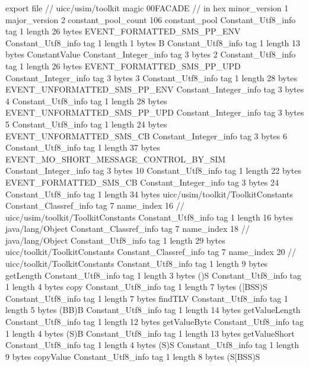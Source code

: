 export file {		// uicc/usim/toolkit
	magic	00FACADE		 // in hex
	minor_version	1
	major_version	2
	constant_pool_count	106
	constant_pool {
		Constant_Utf8_info {
			tag	1
			length	26
			bytes	EVENT_FORMATTED_SMS_PP_ENV
		}
		Constant_Utf8_info {
			tag	1
			length	1
			bytes	B
		}
		Constant_Utf8_info {
			tag	1
			length	13
			bytes	ConstantValue
		}
		Constant_Integer_info {
			tag	3
			bytes	2
		}
		Constant_Utf8_info {
			tag	1
			length	26
			bytes	EVENT_FORMATTED_SMS_PP_UPD
		}
		Constant_Integer_info {
			tag	3
			bytes	3
		}
		Constant_Utf8_info {
			tag	1
			length	28
			bytes	EVENT_UNFORMATTED_SMS_PP_ENV
		}
		Constant_Integer_info {
			tag	3
			bytes	4
		}
		Constant_Utf8_info {
			tag	1
			length	28
			bytes	EVENT_UNFORMATTED_SMS_PP_UPD
		}
		Constant_Integer_info {
			tag	3
			bytes	5
		}
		Constant_Utf8_info {
			tag	1
			length	24
			bytes	EVENT_UNFORMATTED_SMS_CB
		}
		Constant_Integer_info {
			tag	3
			bytes	6
		}
		Constant_Utf8_info {
			tag	1
			length	37
			bytes	EVENT_MO_SHORT_MESSAGE_CONTROL_BY_SIM
		}
		Constant_Integer_info {
			tag	3
			bytes	10
		}
		Constant_Utf8_info {
			tag	1
			length	22
			bytes	EVENT_FORMATTED_SMS_CB
		}
		Constant_Integer_info {
			tag	3
			bytes	24
		}
		Constant_Utf8_info {
			tag	1
			length	34
			bytes	uicc/usim/toolkit/ToolkitConstants
		}
		Constant_Classref_info {
			tag	7
			name_index	16		// uicc/usim/toolkit/ToolkitConstants
		}
		Constant_Utf8_info {
			tag	1
			length	16
			bytes	java/lang/Object
		}
		Constant_Classref_info {
			tag	7
			name_index	18		// java/lang/Object
		}
		Constant_Utf8_info {
			tag	1
			length	29
			bytes	uicc/toolkit/ToolkitConstants
		}
		Constant_Classref_info {
			tag	7
			name_index	20		// uicc/toolkit/ToolkitConstants
		}
		Constant_Utf8_info {
			tag	1
			length	9
			bytes	getLength
		}
		Constant_Utf8_info {
			tag	1
			length	3
			bytes	()S
		}
		Constant_Utf8_info {
			tag	1
			length	4
			bytes	copy
		}
		Constant_Utf8_info {
			tag	1
			length	7
			bytes	([BSS)S
		}
		Constant_Utf8_info {
			tag	1
			length	7
			bytes	findTLV
		}
		Constant_Utf8_info {
			tag	1
			length	5
			bytes	(BB)B
		}
		Constant_Utf8_info {
			tag	1
			length	14
			bytes	getValueLength
		}
		Constant_Utf8_info {
			tag	1
			length	12
			bytes	getValueByte
		}
		Constant_Utf8_info {
			tag	1
			length	4
			bytes	(S)B
		}
		Constant_Utf8_info {
			tag	1
			length	13
			bytes	getValueShort
		}
		Constant_Utf8_info {
			tag	1
			length	4
			bytes	(S)S
		}
		Constant_Utf8_info {
			tag	1
			length	9
			bytes	copyValue
		}
		Constant_Utf8_info {
			tag	1
			length	8
			bytes	(S[BSS)S
}}}

